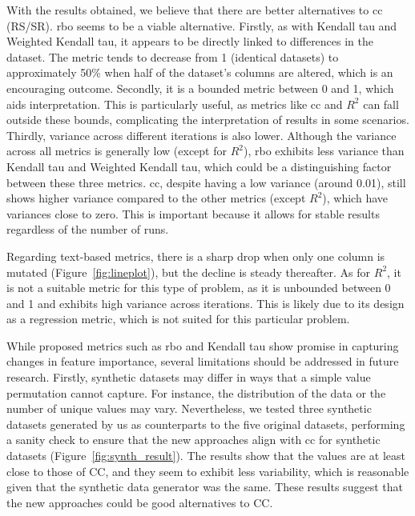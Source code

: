 

With the results obtained, we believe that there are better alternatives to \ac{cc} (RS/SR). \ac{rbo} seems to be a viable alternative. Firstly, as with Kendall tau and Weighted Kendall tau, it appears to be directly linked to differences in the dataset. The metric tends to decrease from 1 (identical datasets) to approximately 50\% when half of the dataset's columns are altered, which is an encouraging outcome. Secondly, it is a bounded metric between 0 and 1, which aids interpretation. This is particularly useful, as metrics like \ac{cc} and $R^2$ can fall outside these bounds, complicating the interpretation of results in some scenarios. Thirdly, variance across different iterations is also lower. Although the variance across all metrics is generally low (except for $R^2$), \ac{rbo} exhibits less variance than Kendall tau and Weighted Kendall tau, which could be a distinguishing factor between these three metrics. \Ac{cc}, despite having a low variance (around 0.01), still shows higher variance compared to the other metrics (except $R^2$), which have variances close to zero. This is important because it allows for stable results regardless of the number of runs.

Regarding text-based metrics, there is a sharp drop when only one column is mutated (Figure~\ref{fig:lineplot}), but the decline is steady thereafter. As for $R^2$, it is not a suitable metric for this type of problem, as it is unbounded between 0 and 1 and exhibits high variance across iterations. This is likely due to its design as a regression metric, which is not suited for this particular problem.

While proposed metrics such as \ac{rbo} and Kendall tau show promise in capturing changes in feature importance, several limitations should be addressed in future research. Firstly, synthetic datasets may differ in ways that a simple value permutation cannot capture. For instance, the distribution of the data or the number of unique values may vary. Nevertheless, we tested three synthetic datasets generated by us as counterparts to the five original datasets, performing a sanity check to ensure that the new approaches align with \ac{cc} for synthetic datasets (Figure~\ref{fig:synth_result}). The results show that the values are at least close to those of CC, and they seem to exhibit less variability, which is reasonable given that the synthetic data generator was the same. These results suggest that the new approaches could be good alternatives to CC.

